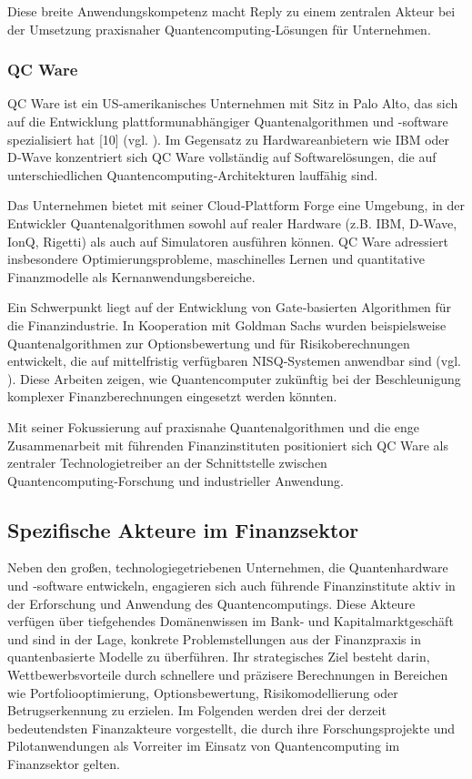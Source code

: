 Diese breite Anwendungskompetenz macht Reply zu einem zentralen Akteur bei der Umsetzung praxisnaher Quantencomputing‑Lösungen für Unternehmen.

\subsubsection*{QC Ware}
QC Ware ist ein US‑amerikanisches Unternehmen mit Sitz in Palo Alto, das sich auf die Entwicklung plattformunabhängiger Quantenalgorithmen und -software spezialisiert hat [10] (vgl. \cite{brandhofer_benchmarking_20220}).
Im Gegensatz zu Hardwareanbietern wie IBM oder D‑Wave konzentriert sich QC Ware vollständig auf Softwarelösungen, die auf unterschiedlichen Quantencomputing‑Architekturen lauffähig sind.

Das Unternehmen bietet mit seiner Cloud‑Plattform Forge eine Umgebung, in der Entwickler Quantenalgorithmen sowohl auf realer Hardware (z.B. IBM, D‑Wave, IonQ, Rigetti) als auch auf Simulatoren ausführen können. QC Ware adressiert insbesondere Optimierungsprobleme, maschinelles Lernen und quantitative Finanzmodelle als Kernanwendungsbereiche.

Ein Schwerpunkt liegt auf der Entwicklung von Gate‑basierten Algorithmen für die Finanzindustrie. In Kooperation mit Goldman Sachs wurden beispielsweise Quantenalgorithmen zur Optionsbewertung und für Risikoberechnungen entwickelt, die auf mittelfristig verfügbaren NISQ‑Systemen anwendbar sind (vgl. \cite{stamatopoulos_option_2020}). Diese Arbeiten zeigen, wie Quantencomputer zukünftig bei der Beschleunigung komplexer Finanzberechnungen eingesetzt werden könnten.

Mit seiner Fokussierung auf praxisnahe Quantenalgorithmen und die enge Zusammenarbeit mit führenden Finanzinstituten positioniert sich QC Ware als zentraler Technologietreiber an der Schnittstelle zwischen Quantencomputing‑Forschung und industrieller Anwendung.

\subsection{Spezifische Akteure im Finanzsektor}
Neben den großen, technologiegetriebenen Unternehmen, die Quantenhardware und ‑software entwickeln, engagieren sich auch führende Finanzinstitute aktiv in der Erforschung und Anwendung des Quantencomputings.  
Diese Akteure verfügen über tiefgehendes Domänenwissen im Bank‑ und Kapitalmarktgeschäft und sind in der Lage, konkrete Problemstellungen aus der Finanzpraxis in quantenbasierte Modelle zu überführen.  
Ihr strategisches Ziel besteht darin, Wettbewerbsvorteile durch schnellere und präzisere Berechnungen in Bereichen wie Portfoliooptimierung, Optionsbewertung, Risikomodellierung oder Betrugserkennung zu erzielen.  
Im Folgenden werden drei der derzeit bedeutendsten Finanzakteure vorgestellt, die durch ihre Forschungsprojekte und Pilotanwendungen als Vorreiter im Einsatz von Quantencomputing im Finanzsektor gelten.

